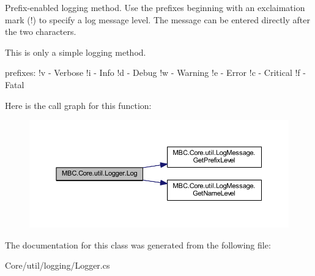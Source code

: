 Prefix-\/enabled logging method. Use the prefixes beginning with an exclaimation mark (!) to specify a log message level. The message can be entered directly after the two characters.\par
 This is only a simple logging method.\par
 


\begin{DoxyItemize}
\item 
\end{DoxyItemize}prefixes\-: !v -\/ Verbose !i -\/ Info !d -\/ Debug !w -\/ Warning !e -\/ Error !c -\/ Critical !f -\/ Fatal 

Here is the call graph for this function\-:
\nopagebreak
\begin{figure}[H]
\begin{center}
\leavevmode
\includegraphics[width=350pt]{class_m_b_c_1_1_core_1_1util_1_1_logger_a9dbb38c93a6869f689516e8f3854981d_cgraph}
\end{center}
\end{figure}




The documentation for this class was generated from the following file\-:\begin{DoxyCompactItemize}
\item 
Core/util/logging/Logger.\-cs\end{DoxyCompactItemize}
